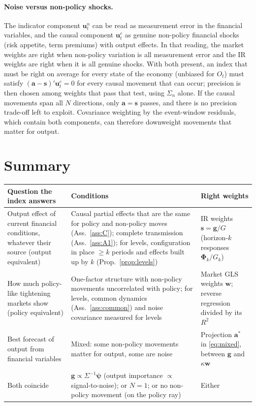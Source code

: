 \documentclass[11pt]{article}
\theoremstyle{definition}
\theoremstyle{remark}
\newcommand{\bpsi}{\boldsymbol{\psi}}
\newcommand{\bu}{\mathbf{u}}
\newcommand{\bg}{\mathbf{g}}
\newcommand{\bs}{\mathbf{s}}
\newcommand{\bw}{\mathbf{w}}
\newcommand{\ba}{\mathbf{a}}
\newcommand{\bPhi}{\boldsymbol{\Phi}}
\begin{document}
\paragraph{Noise versus non-policy shocks.} The indicator component $\bu^n_t$ can be read as measurement error in the financial variables, and the causal component $\bu^c_t$ as genuine non-policy financial shocks (risk appetite, term premiums) with output effects. In that reading, the market weights are right when non-policy variation is all measurement error and the IR weights are right when it is all genuine shocks. With both present, an index that must be right on average for every state of the economy (unbiased for $O_t$) must satisfy $(\ba-\bs)'\bu^c_t=0$ for every causal movement that can occur; precision is then chosen among weights that pass that test, using $\Sigma_n$ alone. If the causal movements span all $N$ directions, only $\ba=\bs$ passes, and there is no precision trade-off left to exploit. Covariance weighting by the event-window residuals, which contain both components, can therefore downweight movements that matter for output.

\section{Summary}

\begin{table}[h]
\centering
\small
\begin{tabular}{p{4.2cm}p{6.2cm}p{4.2cm}}
\toprule
Question the index answers & Conditions & Right weights \\
\midrule
Output effect of current financial conditions, whatever their source (output equivalent) &
Causal partial effects that are the same for policy and non-policy moves (Ass.~\ref{ass:C}); complete transmission (Ass.~\ref{ass:A1}); for levels, configuration in place $\ge k$ periods and effects built up by $k$ (Prop.~\ref{prop:levels}) &
IR weights $\bs=\bg/G$ (horizon-$k$ responses $\bPhi_k/G_k$) \\[3pt]
How much policy-like tightening markets show (policy equivalent) &
One-factor structure with non-policy movements uncorrelated with policy; for levels, common dynamics (Ass.~\ref{ass:common}) and noise covariance measured for levels &
Market GLS weights $\bw$; reverse regression divided by its $R^2$ \\[3pt]
Best forecast of output from financial variables &
Mixed: some non-policy movements matter for output, some are noise &
Projection $\ba^*$ in \eqref{eq:mixed}, between $\bg$ and $\kappa\bw$ \\[3pt]
Both coincide &
$\bg\propto\Sigma^{-1}\bpsi$ (output importance $\propto$ signal-to-noise); or $N=1$; or no non-policy movement (on the policy ray) &
Either \\
\bottomrule
\end{tabular}
\end{table}
\end{document}
